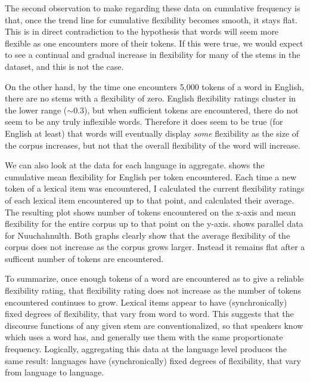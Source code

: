 The second observation to make regarding these data on cumulative frequency is that, once the trend line for cumulative flexibility becomes smooth, it stays flat. This is in direct contradiction to the hypothesis that words will seem more flexible as one encounters more of their tokens. If this were true, we would expect to see a continual and gradual increase in flexibility for many of the stems in the dataset, and this is not the case.

On the other hand, by the time one encounters 5,000 tokens of a word in English, there are no stems with a flexibility of zero. English flexibility ratings cluster in the lower range ($\sim0.3$), but when sufficient tokens are encountered, there do not seem to be any truly inflexible words. Therefore it does seem to be true (for English at least) that words will eventually display \emph{some} flexibility as the size of the corpus increases, but not that the overall flexibility of the word will increase.

We can also look at the data for each language in aggregate.  shows the cumulative mean flexibility for English per token encountered. Each time a new token of a lexical item was encountered, I calculated the current flexibility ratings of each lexical item encountered up to that point, and calculated their average. The resulting plot shows number of tokens encountered on the x-axis and mean flexibility for the entire corpus up to that point on the y-axis.  shows parallel data for Nuuchahnulth. Both graphs clearly show that the average flexibility of the corpus does not increase as the corpus grows larger. Instead it remains flat after a sufficent number of tokens are encountered.


To summarize, once enough tokens of a word are encountered as to give a reliable flexibility rating, that flexibility rating does not increase as the number of tokens encountered continues to grow. Lexical items appear to have (synchronically) fixed degrees of flexibility, that vary from word to word. This suggests that the discourse functions of any given stem are conventionalized, so that speakers know which uses a word has, and generally use them with the same proportionate frequency. Logically, aggregating this data at the language level produces the same result: languages have (synchronically) fixed degrees of flexibility, that vary from language to language.

